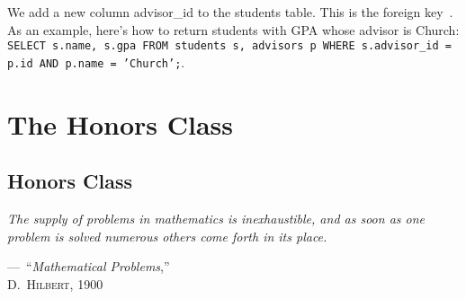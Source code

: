 \documentclass[10pt,openany,twoside,letterpaper,extrafontsizes]{memoir}
\newif\ifscaleforSixNine
\newcommand{\sixninepigraphwidth}[1]{
\ifscaleforSixNine
\setlength{\epigraphwidth}{#1\textwidth}
\fi
}
\newcommand{\epioffset}{0mm}
\newcommand{\sixnineEpi}[3]{
\ifscaleforSixNine
\renewcommand{\blueboxheight}{#1}
\setlength{\epigraphwidth}{#2\textwidth}
\renewcommand{\epioffset}{#3}
\fi
}
\newcommand\myepigraph[3]{%
\vspace{#3}%
\epigraph{\textit{#1}}{#2}%
}
\newcommand{\blueboxheight}{10}
\begin{document}
\begin{Spacing}{\commonToolsSpacing}
We add a new column advisor\_id to the students table. This is the foreign key~.
As an example, here's how to return students with GPA whose advisor is Church:
\texttt{SELECT s.name, s.gpa FROM students s, advisors p WHERE s.advisor\_id = p.id AND p.name = 'Church';}.


\ansend

\end{Spacing}

\part{The Honors Class}

\renewcommand{\blueboxheight}{12}
\setlength{\epigraphwidth}{0.42\textwidth}
\sixninepigraphwidth{0.50}
\renewcommand{\epioffset}{-34.5mm}
\sixnineEpi{12}{0.42}{-34.5mm}
\chapter{Honors Class}
\label{chap-ninja}

\myepigraph{%
The supply of problems in mathematics is inexhaustible, and as soon as one problem
is solved numerous others come forth in its place.
}
{---~``\textit{Mathematical Problems},''\\ \textsc{D.~Hilbert}, 1900}{\epioffset}
\end{document}

